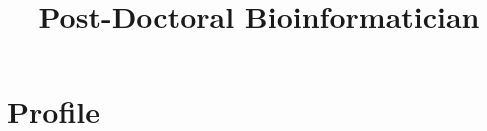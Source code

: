 \documentclass[11pt,a4paper,]{moderncv}
\title{Post-Doctoral Bioinformatician}
\begin{document}
\makecvtitle



\renewcommand*{\cventry}[7][-3.5mm]{%
  \cvitem[#1]{#2}{%
    {\bfseries#3}%
    \ifthenelse{\equal{#4}{}}{}{, {\slshape#4}}%
    \ifthenelse{\equal{#5}{}}{}{, #5}%
    \ifthenelse{\equal{#6}{}}{}{, #6}%
    .\strut%
    \ifx&#7&%
    \else{\newline{}\begin{minipage}[t]{\linewidth}\small#7\end{minipage}}\fi}}

\hypertarget{profile}{%
\section{Profile}\label{profile}}
\end{document}
